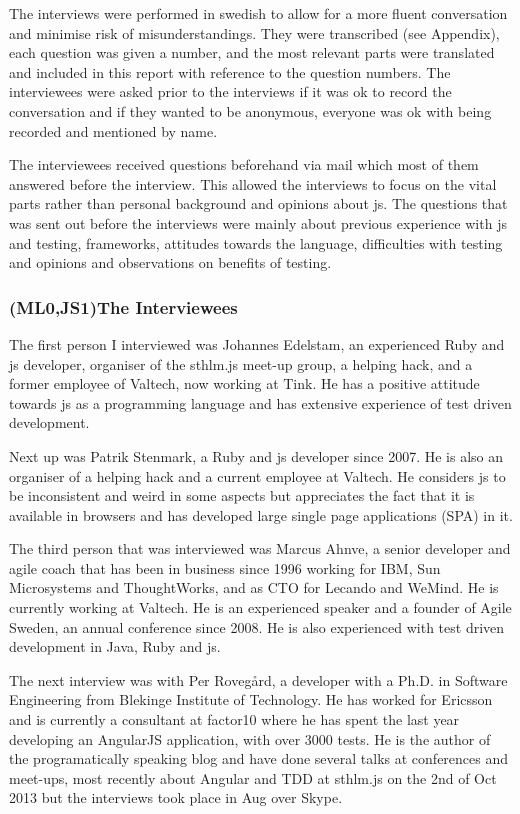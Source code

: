 \documentclass[11pt]{article}
\begin{document}
The interviews were performed in swedish to allow for a more fluent conversation and minimise risk of misunderstandings. They were transcribed (see Appendix), each question was given a number, and the most relevant parts were translated and included in this report with reference to the question numbers. The interviewees were asked prior to the interviews if it was ok to record the conversation and if they wanted to be anonymous, everyone was ok with being recorded and mentioned by name.

The interviewees received questions beforehand via mail which most of them answered before the interview. This allowed the interviews to focus on the vital parts rather than personal background and opinions about \gls{js}. The questions that was sent out before the interviews were mainly about previous experience with \gls{js} and testing, frameworks, attitudes towards the language, difficulties with testing and opinions and observations on benefits of testing.

\subsubsection{(ML0,JS1)The Interviewees}
\label{ssubsec:interviewees}

The first person I interviewed was Johannes Edelstam, an experienced Ruby and \gls{js} developer, organiser of the sthlm.js meet-up group, a helping hack, and a former employee of Valtech, now working at Tink. He has a positive attitude towards \gls{js} as a programming language and has extensive experience of test driven development.

Next up was Patrik Stenmark, a Ruby and \gls{js} developer since 2007. He is also an organiser of a helping hack and a current employee at Valtech. He considers \gls{js} to be inconsistent and weird in some aspects but appreciates the fact that it is available in browsers and has developed large single page applications (SPA) in it.

The third person that was interviewed was Marcus Ahnve, a senior developer and agile coach that has been in business since 1996 working for IBM, Sun Microsystems and ThoughtWorks, and as CTO for Lecando and WeMind. He is currently working at Valtech. He is an experienced speaker and a founder of Agile Sweden, an annual conference since 2008. He is also experienced with test driven development in Java, Ruby and \gls{js}.

The next interview was with Per Rovegård, a developer with a Ph.D. in Software Engineering from Blekinge Institute of Technology. He has worked for Ericsson and is currently a consultant at factor10 where he has spent the last year developing an AngularJS application, with over 3000 tests. He is the author of the programatically speaking blog and have done several talks at conferences and meet-ups, most recently about Angular and TDD at sthlm.js on the 2nd of Oct 2013 but the interviews took place in Aug over Skype.
\end{document}
